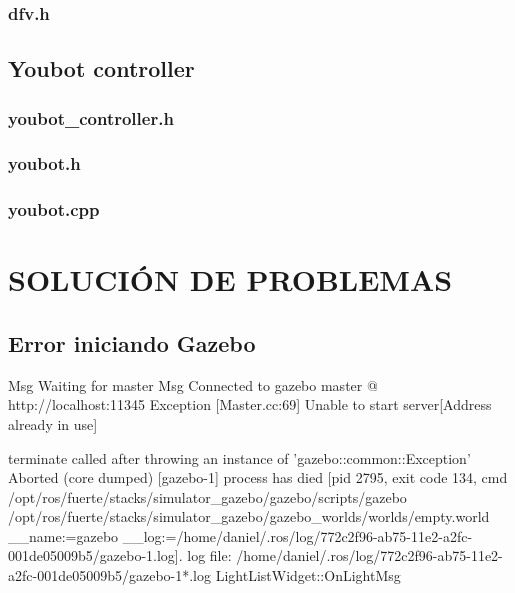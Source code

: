 \documentclass[10pt, a4paper]{report}
\begin{document}
\subsection{dfv.h}
\lstset{inputencoding=utf8/latin1}

\newpage

\section{Youbot controller}

\subsection{youbot\_controller.h}
\lstset{inputencoding=utf8/latin1}

\newpage

\subsection{youbot.h}
\lstset{inputencoding=utf8/latin1}

\newpage

\subsection{youbot.cpp}
\lstset{inputencoding=utf8/latin1}

\newpage


\chapter{SOLUCIÓN DE PROBLEMAS}

\section{Error iniciando Gazebo}

\begin{spverbatim}
Msg Waiting for master
Msg Connected to gazebo master @ http://localhost:11345
Exception [Master.cc:69] Unable to start server[Address already in use]


terminate called after throwing an instance of 'gazebo::common::Exception'
Aborted (core dumped)
[gazebo-1] process has died [pid 2795, exit code 134, cmd /opt/ros/fuerte/stacks/simulator_gazebo/gazebo/scripts/gazebo /opt/ros/fuerte/stacks/simulator_gazebo/gazebo_worlds/worlds/empty.world __name:=gazebo __log:=/home/daniel/.ros/log/772c2f96-ab75-11e2-a2fc-001de05009b5/gazebo-1.log].
log file: /home/daniel/.ros/log/772c2f96-ab75-11e2-a2fc-001de05009b5/gazebo-1*.log
LightListWidget::OnLightMsg
\end{spverbatim}
\end{document}
